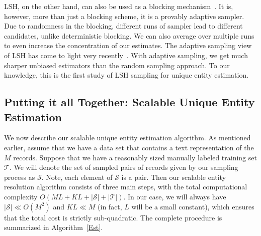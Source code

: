 \documentclass[aoas]{imsart}
\begin{document}
LSH, on the other hand, can also be used as a blocking mechanism~\citep{steorts14comparison}. It is, however, more than just a blocking scheme, it is a provably adaptive sampler.
Due to randomness in the blocking, different runs of sampler lead to different candidates, unlike deterministic blocking. We can also average over multiple runs to even increase the concentration of our estimates. The adaptive sampling view of LSH has come to light very recently~\citep{spring2017scalable,spring2017new,luo2017Arrays}. With adaptive sampling, we get much sharper unbiased estimators than the random sampling approach. To our knowledge, this is the first study of LSH sampling for unique entity estimation.

\subsection{Putting it all Together: Scalable Unique Entity Estimation}
\label{putit}

We now describe our scalable unique entity estimation algorithm.  As mentioned earlier, assume that we have a data set that contains a text representation of the $M$ records. Suppose that we have a reasonably sized manually labeled training set $\mathcal{T}$. We will denote the set of sampled pairs of records given by our sampling process as $\mathcal{S}$. Note, each element of $\mathcal{S}$ is a pair. Then our scalable entity resolution algorithm consists of three main steps, with the total computational complexity $O(ML+ KL +|\mathcal{S}| +|\mathcal{T}|)$.  In our case, we will always have $|\mathcal{S}| \ll O(M^2)$ and $KL \ll M$ (in fact, $L$ will be a small constant), which ensures that the total cost is strictly sub-quadratic. The complete procedure is summarized in Algorithm~\ref{Est}.
\end{document}

